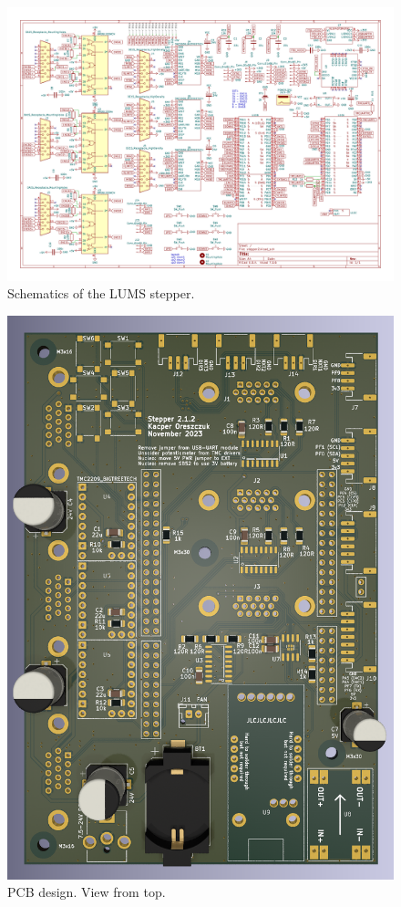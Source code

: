\documentclass[10pt,article]{article}
\begin{document}
\begin{figure}[h]
 \centering
 \includegraphics[width = \textwidth]{schematics.pdf}
\caption {Schematics of the LUMS stepper.} \label{schematics}
\end{figure}


\begin{figure}[h]
 \centering
 \includegraphics[width = 14cm]{render.png}
\caption {PCB design. View from top.} \label{pcb}
\end{figure}



\end{document}
